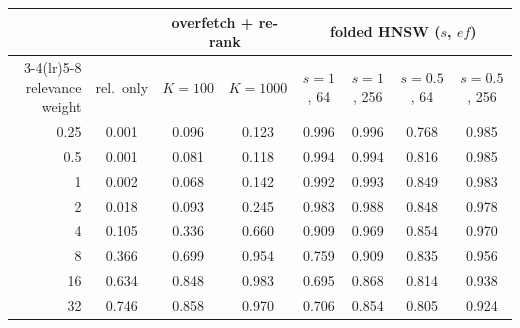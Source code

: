 \begin{tabular}{r ccc cccc}
\toprule
 & & \multicolumn{2}{c}{overfetch + re-rank} & \multicolumn{4}{c}{folded HNSW ($s$, $ef$)}\\
\cmidrule(lr){3-4}\cmidrule(lr){5-8}
relevance weight & rel.\ only & $K{=}100$ & $K{=}1000$ & $s{=}1$, 64 & $s{=}1$, 256 & $s{=}0.5$, 64 & $s{=}0.5$, 256\\
\midrule
0.25 & 0.001 & 0.096 & 0.123 & 0.996 & 0.996 & 0.768 & 0.985\\
0.5 & 0.001 & 0.081 & 0.118 & 0.994 & 0.994 & 0.816 & 0.985\\
1 & 0.002 & 0.068 & 0.142 & 0.992 & 0.993 & 0.849 & 0.983\\
2 & 0.018 & 0.093 & 0.245 & 0.983 & 0.988 & 0.848 & 0.978\\
4 & 0.105 & 0.336 & 0.660 & 0.909 & 0.969 & 0.854 & 0.970\\
8 & 0.366 & 0.699 & 0.954 & 0.759 & 0.909 & 0.835 & 0.956\\
16 & 0.634 & 0.848 & 0.983 & 0.695 & 0.868 & 0.814 & 0.938\\
32 & 0.746 & 0.858 & 0.970 & 0.706 & 0.854 & 0.805 & 0.924\\
\bottomrule
\end{tabular}
